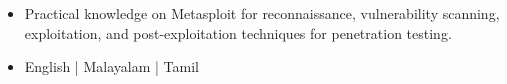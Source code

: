     \begin{itemize}
        \item Practical knowledge on Metasploit for reconnaissance, vulnerability scanning, exploitation, and post-exploitation techniques for penetration testing.
    \end{itemize}

\begin{itemize}
    \item English | Malayalam | Tamil
\end{itemize}

\medskip




